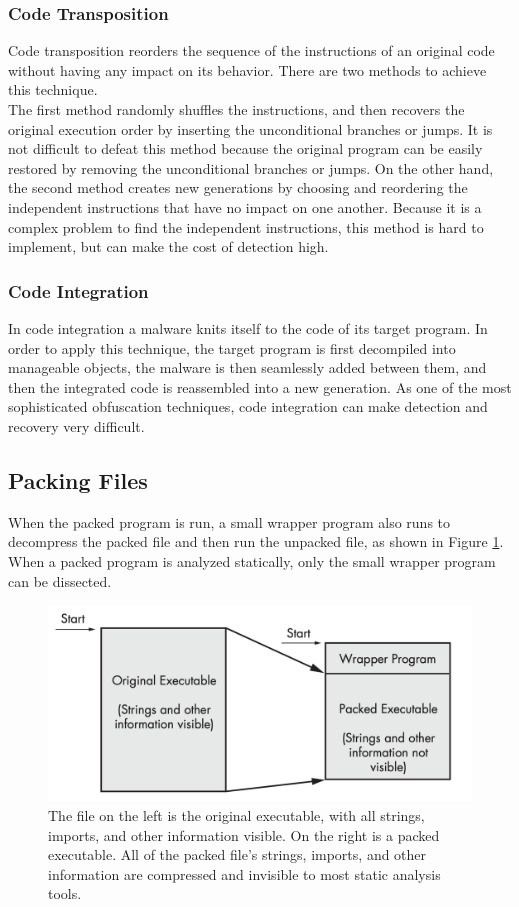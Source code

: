\subsubsection{Code Transposition}
Code transposition reorders the sequence of the instructions of an original code without having any impact on its behavior. There are two methods to achieve this technique. \\
The first method randomly shuffles the instructions, and then recovers the original execution order by inserting the unconditional branches or jumps. It is not difficult to defeat this method because the original program can be easily restored by removing the unconditional branches or jumps. On the other hand, the second method creates new generations by choosing and reordering the independent instructions that have no impact on one another. Because it is a complex problem to find the independent instructions, this method is hard to implement, but can make the cost of detection high. 

\subsubsection{Code Integration}
In code integration a malware knits itself to the code of its target program. In order to apply this technique, the target program is first decompiled into manageable objects, the malware is then seamlessly added between them, and then the integrated code is reassembled into a new generation. As one of the most sophisticated obfuscation techniques, code integration can make detection and recovery very difficult. 

\subsection{Packing Files}
When the packed program is run, a small wrapper program also runs to decompress the packed file and then run the unpacked file, as shown in Figure \ref{fig:Packed}. When a packed program is analyzed statically, only the small wrapper program can be dissected.

\begin{figure}[H]
    \centering
    \includegraphics[width=0.7\linewidth]{Images/Packed.png}
    \caption{The file on the left is the original executable, with all strings, imports, and other information visible. On the right is a packed executable. All of the packed file’s strings, imports, and other information are compressed and invisible to most static analysis tools.}
    \label{fig:Packed}
\end{figure}